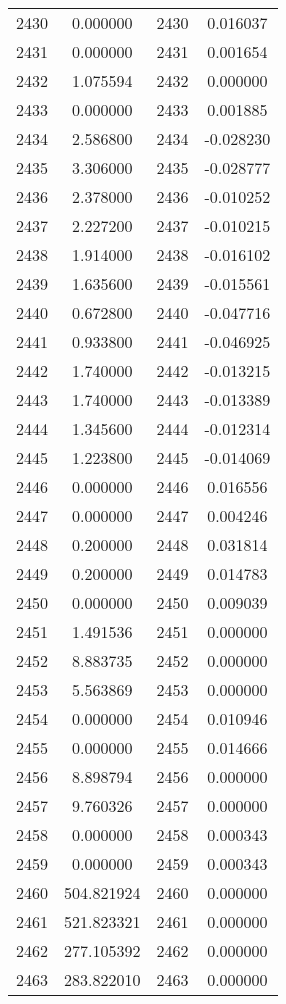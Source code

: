 \documentclass[12pt]{article}
\begin{document}
\begin{longtable}{@{}cccc@{}}
2430 & 0.000000 & 2430 & 0.016037 \\
2431 & 0.000000 & 2431 & 0.001654 \\
2432 & 1.075594 & 2432 & 0.000000 \\
2433 & 0.000000 & 2433 & 0.001885 \\
2434 & 2.586800 & 2434 & -0.028230 \\
2435 & 3.306000 & 2435 & -0.028777 \\
2436 & 2.378000 & 2436 & -0.010252 \\
2437 & 2.227200 & 2437 & -0.010215 \\
2438 & 1.914000 & 2438 & -0.016102 \\
2439 & 1.635600 & 2439 & -0.015561 \\
2440 & 0.672800 & 2440 & -0.047716 \\
2441 & 0.933800 & 2441 & -0.046925 \\
2442 & 1.740000 & 2442 & -0.013215 \\
2443 & 1.740000 & 2443 & -0.013389 \\
2444 & 1.345600 & 2444 & -0.012314 \\
2445 & 1.223800 & 2445 & -0.014069 \\
2446 & 0.000000 & 2446 & 0.016556 \\
2447 & 0.000000 & 2447 & 0.004246 \\
2448 & 0.200000 & 2448 & 0.031814 \\
2449 & 0.200000 & 2449 & 0.014783 \\
2450 & 0.000000 & 2450 & 0.009039 \\
2451 & 1.491536 & 2451 & 0.000000 \\
2452 & 8.883735 & 2452 & 0.000000 \\
2453 & 5.563869 & 2453 & 0.000000 \\
2454 & 0.000000 & 2454 & 0.010946 \\
2455 & 0.000000 & 2455 & 0.014666 \\
2456 & 8.898794 & 2456 & 0.000000 \\
2457 & 9.760326 & 2457 & 0.000000 \\
2458 & 0.000000 & 2458 & 0.000343 \\
2459 & 0.000000 & 2459 & 0.000343 \\
2460 & 504.821924 & 2460 & 0.000000 \\
2461 & 521.823321 & 2461 & 0.000000 \\
2462 & 277.105392 & 2462 & 0.000000 \\
2463 & 283.822010 & 2463 & 0.000000 \\

\end{longtable}
\end{document}
